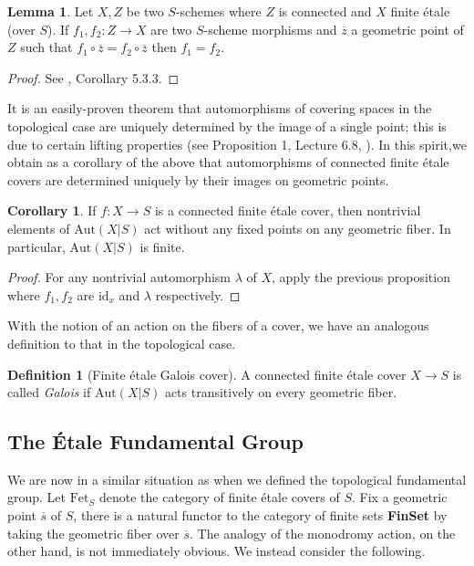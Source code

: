 \documentclass{article}
\theoremstyle{definition}
\newtheorem{lemma}[theorem]{Lemma}
\newtheorem{corollary}[theorem]{Corollary}
\newtheorem{definition}[theorem]{Definition}
\theoremstyle{remark}
\theoremstyle{plain}
\begin{document}
\begin{lemma}
	Let $X, Z$ be two $S$-schemes where $Z$ is connected and $X$ finite \'etale (over $S$). 
	If $f_1, f_2: Z \to X$ are two $S$-scheme morphisms and $\overline{z}$ a geometric point of $Z$  such that $f_1 \circ \overline{z} = f_2 \circ \overline{z}$ then $f_1 = f_2$.
\end{lemma}

\begin{proof}
	See \cite{Szamuely}, Corollary 5.3.3.
\end{proof}

It is an easily-proven theorem that automorphisms of covering spaces in the topological case are uniquely determined by the image of a single point; this is due to certain lifting properties (see Proposition 1, Lecture 6.8, \cite{FomenkoFuchs}).
In this spirit,we obtain as a corollary of the above that automorphisms of connected finite \'etale covers are determined uniquely by their images on geometric points.
\begin{corollary}
	If $f: X \to S$ is a connected finite \'etale cover, then nontrivial elements of $\text{Aut}(X|S)$ act without any fixed points on any geometric fiber.
	In particular, $\text{Aut}(X|S)$ is finite.
\end{corollary}

\begin{proof}
	For any nontrivial automorphism $\lambda$ of $X$, apply the previous proposition where $f_1, f_2$ are $\text{id}_x$ and $\lambda$ respectively.
\end{proof}

With the notion of an action on the fibers of a cover, we have an analogous definition to that in the topological case.

\begin{definition}[Finite \'etale Galois cover]
	A connected finite \'etale cover $X \to S$ is called \textit{Galois} if $\text{Aut}(X|S)$ acts transitively on every geometric fiber.
\end{definition}


\subsection{The \'Etale Fundamental Group}


We are now in a similar situation as when we defined the topological fundamental group.
Let $\text{Fet}_S$ denote the category of finite \'etale covers of $S$.
Fix a geometric point $\overline{s}$ of $S$, there is a natural functor to the category of finite sets \textbf{FinSet} by taking the geometric fiber over $\overline{s}$. 
The analogy of the monodromy action, on the other hand, is not immediately obvious.
We instead consider the following.
\end{document}

